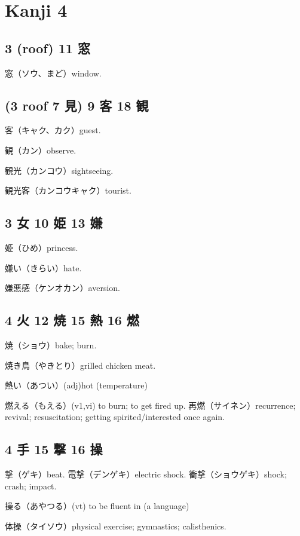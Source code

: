 \chapter{Kanji 4}

\section{3 (roof) 11 窓}

窓（ソウ、まど）window.

\section{(3 roof 7 見) 9 客 18 観}

客（キャク、カク）guest.

観（カン）observe.

観光（カンコウ）sightseeing.

観光客（カンコウキャク）tourist.

\section{3 女 10 姫 13 嫌}

姫（ひめ）princess.

嫌い（きらい）hate.

嫌悪感（ケンオカン）aversion.

\section{4 火 12 焼 15 熱 16 燃}

焼（ショウ）bake; burn.

焼き鳥（やきとり）grilled chicken meat.

熱い（あつい）(adj)hot (temperature)

燃える（もえる）(v1,vi) to burn; to get fired up.
再燃（サイネン）recurrence; revival; resuscitation;
getting spirited/interested once again.

\section{4 手 15 撃 16 操}

撃（ゲキ）beat.
電撃（デンゲキ）electric shock.
衝撃（ショウゲキ）shock; crash; impact.

操る（あやつる）(vt) to be fluent in (a language)

体操（タイソウ）physical exercise; gymnastics; calisthenics.

